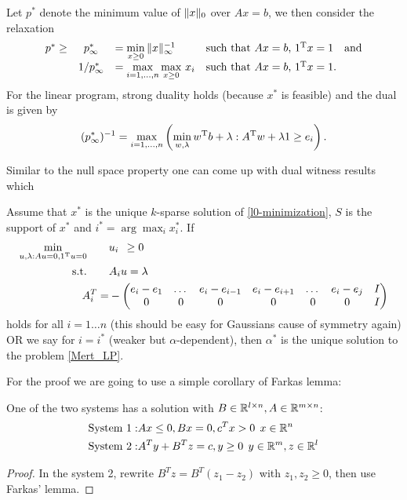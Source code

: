 \documentclass{article} %
\begin{document}
Let $p^*$ denote the minimum value of $\lVert x\rVert_0$ over $Ax = b$, we then consider the relaxation
\begin{equation}\label{l8-recovery}
  \begin{array}{rcllllr}
  p^* \geq& p_\infty^* &= \min\limits_{x\geq 0}\, \lVert x\rVert_\infty^{-1}&\text{such that $Ax = b$, $1^{\rm T} x = 1$}\quad \text{and}\\[5pt]
  &1/p_\infty^* &= \max\limits_{i=1,\dots,n} \max\limits_{x\geq 0}\,x_i&\text{such that $Ax = b$, $1^{\rm T} x = 1$.}
  \end{array}
\end{equation}
For the linear program, strong duality holds (because $x^*$ is feasible) and the dual is given by
\begin{equation}\label{l8-recovery-dual}
  (p_\infty^*)^{-1} = \max_{i=1,\dots,n} \left(\min_{w,\lambda} w^{\rm T} b + \lambda : A^{\rm T} w + \lambda 1 \geq e_i\right).
\end{equation}

Similar to the null space property one can come up with dual witness results which 
\begin{theorem}
\label{Maxmax_Oneblock}
Assume that $x^*$ is the unique $k$-sparse solution of \eqref{l0-minimization}, $S$ is the support of $x^*$ and $i^* = \arg\max_i x^*_i$. If
\begin{align*}
\min_{u,\lambda: Au = 0, 1^{\rm T} u = 0} \qquad & u_i \:\: \geq 0\\
\text{s.t.} \qquad& A_i u = \lambda\\
A_i^T = &-\begin{pmatrix} e_i - e_{1} & \dots & e_i - e_{i-1} & e_i - e_{i+1} & \dots & e_i - e_j & I\\
0 & 0 & 0&0&0&0& I
\end{pmatrix}
\end{align*}
holds for all $i = 1\dots n$ (this should be easy for Gaussians cause of symmetry again) OR we say for $i = i^*$ (weaker but $\alpha$-dependent), then $\alpha^*$ is the unique solution to the problem \eqref{Mert_LP}.
\end{theorem}

For the proof we are going to use a simple corollary of Farkas lemma:
\begin{lemma}
  \label{Farkas_Corollary}
  One of the two systems has a solution with $B \in \mathbb{R}^{l\times n}, A\in \mathbb{R}^{m\times n}$:
  \begin{align*}
    \text{System 1}: & Ax \leq 0, Bx = 0, c^Tx >0\:\: x\in \mathbb{R}^n\\
    \text{System 2}: & A^T y + B^T z = c, y\geq 0\:\: y\in \mathbb{R}^m, z\in \mathbb{R}^l
  \end{align*}
\end{lemma}
\begin{proof}
  In the system 2, rewrite $B^T z = B^T (z_1 - z_2)$ with $z_1,z_2 \geq 0$, then use Farkas' lemma. 
\end{proof}
\end{document}

